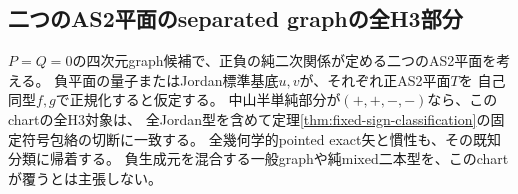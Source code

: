 \subsection{二つのAS2平面のseparated graphの全H3部分}
\label{subsec:h3-order2-22-rank4-separated-AS2}
\begin{theorem}\label{thm:h3-order2-22-rank4-separated-AS2}
$P=Q=0$の四次元graph候補で、正負の純二次関係が定める二つのAS2平面を考える。
負平面の量子またはJordan標準基底$u,v$が、それぞれ正AS2平面$T$を
自己同型$f,g$で正規化すると仮定する。
中山半単純部分が$(+,+,-,-)$なら、このchartの全H3対象は、
全Jordan型を含めて定理\ref{thm:fixed-sign-classification}の固定符号包絡の切断に一致する。
全幾何学的pointed exact矢と慣性も、その既知分類に帰着する。
負生成元を混合する一般graphや純mixed二本型を、このchartが覆うとは主張しない。
\end{theorem}
